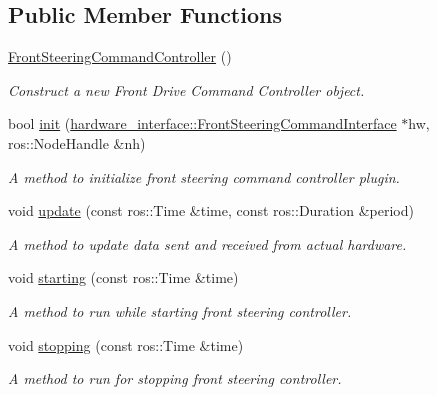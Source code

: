 \subsection*{Public Member Functions}
\begin{DoxyCompactItemize}
\item 
\mbox{\label{classfront__steering__command__controller_1_1FrontSteeringCommandController_aa52635d68962f5bc06254fb92d6376c4}} 
\hyperlink{classfront__steering__command__controller_1_1FrontSteeringCommandController_aa52635d68962f5bc06254fb92d6376c4}{Front\+Steering\+Command\+Controller} ()
\begin{DoxyCompactList}\small\item\em Construct a new Front Drive Command Controller object. \end{DoxyCompactList}\item 
bool \hyperlink{classfront__steering__command__controller_1_1FrontSteeringCommandController_aba8c766d01b5e1866226333917dc243a}{init} (\hyperlink{classhardware__interface_1_1FrontSteeringCommandInterface}{hardware\+\_\+interface\+::\+Front\+Steering\+Command\+Interface} $\ast$hw, ros\+::\+Node\+Handle \&nh)
\begin{DoxyCompactList}\small\item\em A method to initialize front steering command controller plugin. \end{DoxyCompactList}\item 
void \hyperlink{classfront__steering__command__controller_1_1FrontSteeringCommandController_aaeb307f29082c65582775309704b1ad8}{update} (const ros\+::\+Time \&time, const ros\+::\+Duration \&period)
\begin{DoxyCompactList}\small\item\em A method to update data sent and received from actual hardware. \end{DoxyCompactList}\item 
void \hyperlink{classfront__steering__command__controller_1_1FrontSteeringCommandController_af597bea88a7ad505b918ce0ef8157407}{starting} (const ros\+::\+Time \&time)
\begin{DoxyCompactList}\small\item\em A method to run while starting front steering controller. \end{DoxyCompactList}\item 
void \hyperlink{classfront__steering__command__controller_1_1FrontSteeringCommandController_a442344a75d48347c41ab7457397e06cc}{stopping} (const ros\+::\+Time \&time)
\begin{DoxyCompactList}\small\item\em A method to run for stopping front steering controller. \end{DoxyCompactList}\end{DoxyCompactItemize}


